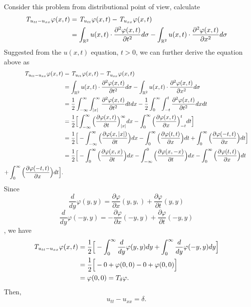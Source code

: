 \documentclass[a4paper, 11pt]{article}
\begin{document}
Consider this problem from distributional point of view, calculate
\begin{align*}
\emph{T}_{u_{tt}-u_{xx}}\varphi(x,t)
& =\emph{T}_{u_{tt}}\varphi(x,t)-\emph{T}_{u_{xx}}\varphi(x,t)\\
& = \int_{\mathbb{R}^{2}}u(x,t)\cdot\frac{\partial^{2}\varphi(x,t)}{\partial t^{2}}d\sigma-\int_{\mathbb{R}^{2}}u(x,t)\cdot\frac{\partial^{2}\varphi(x,t)}{\partial x^{2}}d\sigma
\end{align*}
Suggested from the $u(x,t)$ equation, $t > 0$, we can further derive the equation above as
\begin{align*}
\emph{T}_{u_{tt}-u_{xx}}\varphi(x,t)
& =\emph{T}_{u_{tt}}\varphi(x,t)-\emph{T}_{u_{xx}}\varphi(x,t)\\
& = \int_{\mathbb{R}^{2}}u(x,t)\cdot\frac{\partial^{2}\varphi(x,t)}{\partial t^{2}}d\sigma-\int_{\mathbb{R}^{2}}u(x,t)\cdot\frac{\partial^{2}\varphi(x,t)}{\partial x^{2}}d\sigma\\
& = \frac{1}{2}\int_{-\infty}^{\infty}\int_{\left|x\right|}^{\infty}\frac{\partial^{2}\varphi(x,t)}{\partial t^{2}}dt dx-\frac{1}{2}\int_{0}^{\infty}\int_{-t}^{t}\frac{\partial^{2}\varphi(x,t)}{\partial t^{2}}dx dt\\
& = \frac{1}{2}\Big[\int_{-\infty}^{\infty}\Big(\frac{\partial \varphi(x,t)}{\partial t}\Big)^{\infty}_{\left|x\right|}dx-\int_{0}^{\infty}\Big(\frac{\partial \varphi(x,t)}{\partial x}\Big)^{t}_{-t}dt\Big]\\
& = \frac{1}{2}\Big[-\int_{-\infty}^{\infty}\Big(\frac{\partial \varphi(x,\left|x\right|)}{\partial t}\Big)dx-\int_{0}^{\infty}\Big(\frac{\partial \varphi(t,t)}{\partial x}\Big)dt+\int_{0}^{\infty}\Big(\frac{\partial \varphi(-t,t)}{\partial x}\Big)dt\Big]\\
& = \frac{1}{2}\Big[-\int_{0}^{\infty}\Big(\frac{\partial \varphi(x,x)}{\partial t}\Big)dx-\int_{-\infty}^{0}\Big(\frac{\partial \varphi(x,-x)}{\partial t}\Big)dx-\int_{0}^{\infty}\Big(\frac{\partial \varphi(t,t)}{\partial x}\Big)dt\\
+\int_{0}^{\infty}\Big(\frac{\partial \varphi(-t,t)}{\partial x}\Big)dt\Big].
\end{align*}
Since
$$
    \frac{d}{dy}\varphi(y,y)=\frac{\partial \varphi}{\partial x}(y,y,)+\frac{\partial \varphi}{\partial t}(y,y)
$$
$$
    \frac{d}{dy}\varphi(-y,y)=-\frac{\partial \varphi}{\partial x}(-y,y)+\frac{\partial \varphi}{\partial t}(-y,y)
$$
, we have
\begin{align*}
\emph{T}_{u_{tt}-u_{xx}}\varphi(x,t)
& =\frac{1}{2}\Big[-\int_{0}^{\infty}\frac{d}{dy}\varphi(y,y)dy+\int_{0}^{\infty}\frac{d}{dy}\varphi(-y,y)dy\Big]\\
& = \frac{1}{2}\Big[-0+\varphi(0,0)-0+\varphi(0,0)\Big]\\
& = \varphi(0,0)= T_{\delta}\varphi.
\end{align*}
Then,
$$
    u_{tt}-u_{xx}=\delta.
$$
\end{document}
